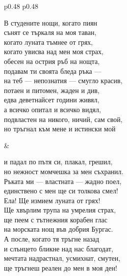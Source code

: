 \documentclass[12pt,a4paper]{article}
\begin{document}
\begin{tabular}{p{0.48\textwidth} p{0.48\textwidth}}
\begin{minipage}[t]{\linewidth}
В студените нощи, когато пиян\\
сънят се търкаля на моя таван,\\
когато луната тъмнее от грях,\\
когато увисва над мен моя страх,\\
обесен на острия ръб на нощта,\\
подавам ти своята бледа ръка —\\
на теб — непознатия — смугло красив,\\
потаен и питомен, жаден и див,\\
едва деветнайсет години живял,\\
а всичко опитал и всичко видял,\\
подвластен на никого, ничий, сам свой,\\
но тръгнал към мене и истински мой\\
\end{minipage}
&
\begin{minipage}[t]{\linewidth}
и падал по пътя си, плакал, грешил,\\
но нежност момчешка за мен съхранил.\\
Ръката ми — властната — жадно поел,\\
единствено с мен ще си толкова смел!\\
Ела! Ще измием луната от грях!\\
Ще хвърлим трупа на умрелия страх,\\
ще пеем с тътнежния корабен глас\\
на морската нощ във добрия Бургас.\\
А после, когато тя тръгне назад\\
и слънцето бликне над нас благодат,\\
мечтата надрастнал, усмихнат, смутен,\\
ще тръгнеш реален до мен в моя ден!\\
\end{minipage}
\end{tabular}
\end{document}
